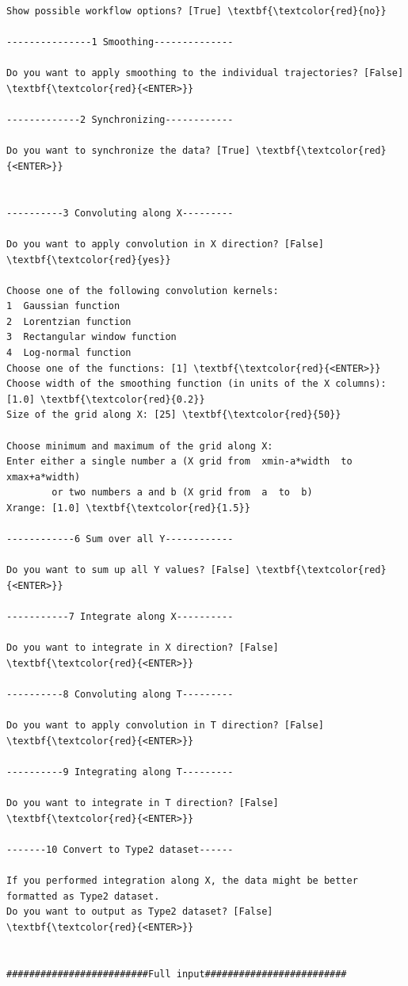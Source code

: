 \documentclass[a4paper,11pt,DIV=15,openany]{scrbook}
\begin{document}
\begin{oframed}
\begin{Verbatim}[commandchars=\\\{\}]
Show possible workflow options? [True] \textbf{\textcolor{red}{no}}

---------------1 Smoothing--------------

Do you want to apply smoothing to the individual trajectories? [False] \textbf{\textcolor{red}{<ENTER>}}

-------------2 Synchronizing------------

Do you want to synchronize the data? [True] \textbf{\textcolor{red}{<ENTER>}}


----------3 Convoluting along X---------

Do you want to apply convolution in X direction? [False] \textbf{\textcolor{red}{yes}}

Choose one of the following convolution kernels:
1  Gaussian function
2  Lorentzian function
3  Rectangular window function
4  Log-normal function
Choose one of the functions: [1] \textbf{\textcolor{red}{<ENTER>}}
Choose width of the smoothing function (in units of the X columns): [1.0] \textbf{\textcolor{red}{0.2}}
Size of the grid along X: [25] \textbf{\textcolor{red}{50}}

Choose minimum and maximum of the grid along X:
Enter either a single number a (X grid from  xmin-a*width  to  xmax+a*width)
        or two numbers a and b (X grid from  a  to  b)
Xrange: [1.0] \textbf{\textcolor{red}{1.5}}

------------6 Sum over all Y------------

Do you want to sum up all Y values? [False] \textbf{\textcolor{red}{<ENTER>}}

-----------7 Integrate along X----------

Do you want to integrate in X direction? [False] \textbf{\textcolor{red}{<ENTER>}}

----------8 Convoluting along T---------

Do you want to apply convolution in T direction? [False] \textbf{\textcolor{red}{<ENTER>}}

----------9 Integrating along T---------

Do you want to integrate in T direction? [False] \textbf{\textcolor{red}{<ENTER>}}

-------10 Convert to Type2 dataset------

If you performed integration along X, the data might be better formatted as Type2 dataset.
Do you want to output as Type2 dataset? [False] \textbf{\textcolor{red}{<ENTER>}}


#########################Full input#########################


\end{Verbatim}
\end{oframed}
\end{document}

